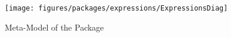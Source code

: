 %
%

\begin{figure}[htb]
  \centering
  \texttt{[image: figures/packages/expressions/ExpressionsDiag]}
  \caption{Meta-Model of the  Package}
  \label{fig:MM:expressions}
\end{figure}
